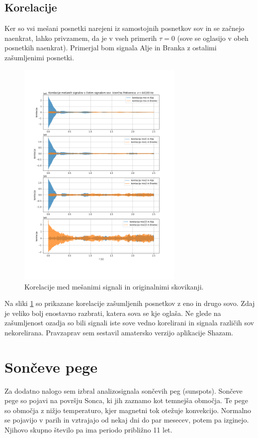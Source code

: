 \documentclass[a4paper, 12pt, slovene]{article}
\begin{document}
\subsection{Korelacije}
Ker so vsi mešani posnetki narejeni iz samostojnih posnetkov sov in se začnejo naenkrat, lahko privzamem, da je v vseh primerih $\tau = 0$ (sove se oglasijo v obeh posnetkih naenkrat). Primerjal bom signala Alje in Branka z ostalimi zašumljenimi posnetki. \par\vspace{5mm}

\begin{figure}[H]
\centering
\includegraphics[width=0.71\textwidth]{grafi/korelacije.png}
\caption{Korelacije med mešanimi signali in originalnimi skovikanji.}
\label{f:korelacije-sove}
\end{figure}

Na sliki \ref{f:korelacije-sove} so prikazane korelacije zašumljenih posnetkov z eno in drugo sovo. Zdaj je veliko bolj enostavno razbrati, katera sova se kje oglaša. Ne glede na zašumljenost ozadja so bili signali iste sove vedno korelirani in signala različih sov nekorelirana. Pravzaprav sem sestavil amatersko verzijo aplikacije Shazam.



\section{Sončeve pege}
Za dodatno nalogo sem izbral analizosignala sončevih peg (sunspots). Sončeve pege so pojavi na površju Sonca, ki jih zaznamo kot temnejša območja. Te pege so območja z nižjo temperaturo, kjer magnetni tok otežuje konvekcijo. Normalno se pojavijo v parih in vztrajajo od nekaj dni do par mesecev, potem pa izginejo. Njihovo skupno število pa ima periodo približno 11 let. \par\vspace{5mm}
\end{document}
